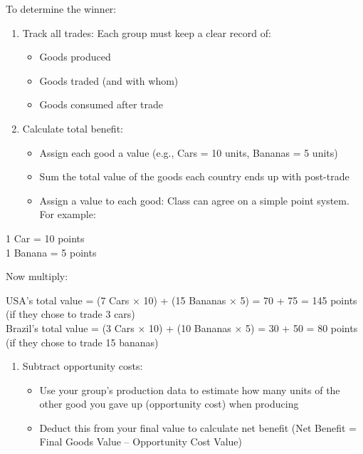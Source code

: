 \documentclass[
  11pt,
]{article}
\providecommand{\tightlist}{%
  \setlength{\itemsep}{0pt}\setlength{\parskip}{0pt}}
\begin{document}
To determine the winner:

\begin{enumerate}
\def\labelenumi{\arabic{enumi}.}
\tightlist
\item
  Track all trades: Each group must keep a clear record of:

  \begin{itemize}
  \tightlist
  \item
    Goods produced
  \item
    Goods traded (and with whom)
  \item
    Goods consumed after trade
  \end{itemize}
\item
  Calculate total benefit:

  \begin{itemize}
  \tightlist
  \item
    Assign each good a value (e.g., Cars = 10 units, Bananas = 5 units)
  \item
    Sum the total value of the goods each country ends up with
    post-trade
  \item
    Assign a value to each good: Class can agree on a simple point
    system. For example:
  \end{itemize}
\end{enumerate}

1 Car = 10 points\\
1 Banana = 5 points

Now multiply:

USA's total value = (7 Cars × 10) + (15 Bananas × 5) = 70 + 75 = 145
points (if they chose to trade 3 cars)\\
Brazil's total value = (3 Cars × 10) + (10 Bananas × 5) = 30 + 50 = 80
points (if they chose to trade 15 bananas)

\begin{enumerate}
\def\labelenumi{\arabic{enumi}.}
\setcounter{enumi}{2}
\tightlist
\item
  Subtract opportunity costs:

  \begin{itemize}
  \tightlist
  \item
    Use your group's production data to estimate how many units of the
    other good you gave up (opportunity cost) when producing
  \item
    Deduct this from your final value to calculate net benefit (Net
    Benefit = Final Goods Value -- Opportunity Cost Value)
  \end{itemize}
\end{enumerate}
\end{document}
